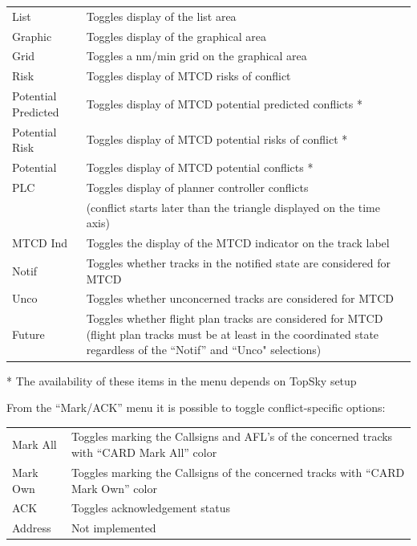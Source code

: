 \documentclass[11pt,a4paper]{memoir}
\begin{document}
\begin{tabular}{l l}
    List                & Toggles display of the list area\\
    Graphic             & Toggles display of the graphical area\\
    Grid                & Toggles a nm/min grid on the graphical area\\
    Risk                & Toggles display of MTCD risks of conflict\\
    Potential Predicted & Toggles display of MTCD potential predicted conflicts *\\
    Potential Risk      & Toggles display of MTCD potential risks of conflict *\\
    Potential           & Toggles display of MTCD potential conflicts *\\
    PLC                 & Toggles display of planner controller conflicts\\
                        & (conflict starts later than the triangle displayed on the time axis)\\
    MTCD Ind            & Toggles the display of the MTCD indicator on the track label\\
    Notif               & Toggles whether tracks in the notified state are considered for MTCD\\
    Unco                & Toggles whether unconcerned tracks are considered for MTCD\\
    Future              & Toggles whether flight plan tracks are considered for MTCD (flight plan tracks must be at least in the coordinated state regardless of the “Notif” and “Unco" selections)\\
\end{tabular}

* The availability of these items in the menu depends on TopSky setup

From the “Mark/ACK” menu it is possible to toggle conflict-specific options:

\begin{tabular}{l l}
    Mark All    & Toggles marking the Callsigns and AFL’s of the concerned tracks with “CARD Mark All” color\\
    Mark Own    & Toggles marking the Callsigns of the concerned tracks with “CARD Mark Own” color\\
    ACK         & Toggles acknowledgement status\\
    Address     & Not implemented\\
\end{tabular}
\end{document}

